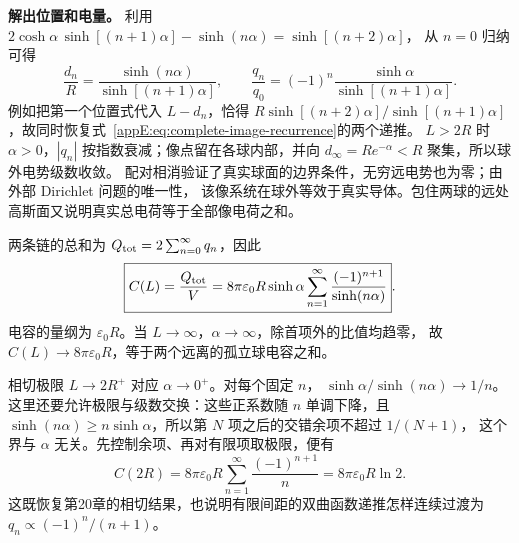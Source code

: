 \textbf{解出位置和电量。}
利用 $2\cosh\alpha\,\sinh[(n+1)\alpha]-\sinh(n\alpha)=\sinh[(n+2)\alpha]$，
从 $n=0$ 归纳可得
\[
 \frac{d_n}{R}=\frac{\sinh(n\alpha)}{\sinh[(n+1)\alpha]},\qquad
 \frac{q_n}{q_0}=(-1)^n\frac{\sinh\alpha}{\sinh[(n+1)\alpha]}.
\]
例如把第一个位置式代入 $L-d_n$，恰得
$R\sinh[(n+2)\alpha]/\sinh[(n+1)\alpha]$，故同时恢复式~\eqref{appE:eq:complete-image-recurrence}的两个递推。
$L>2R$ 时 $\alpha>0$，$|q_n|$ 按指数衰减；像点留在各球内部，并向
$d_\infty=Re^{-\alpha}<R$ 聚集，所以球外电势级数收敛。
配对相消验证了真实球面的边界条件，无穷远电势也为零；由外部 Dirichlet 问题的唯一性，
该像系统在球外等效于真实导体。包住两球的远处高斯面又说明真实总电荷等于全部像电荷之和。

两条链的总和为 $Q_{\rm tot}=2\sum_{n=0}^\infty q_n$，因此
\[
 \boxed{C(L)=\frac{Q_{\rm tot}}V
 =8\pi\varepsilon_0R\sinh\alpha
 \sum_{n=1}^\infty\frac{(-1)^{n+1}}{\sinh(n\alpha)}}.
\]
电容的量纲为 $\varepsilon_0R$。当 $L\to\infty$，$\alpha\to\infty$，除首项外的比值均趋零，
故 $C(L)\to8\pi\varepsilon_0R$，等于两个远离的孤立球电容之和。

相切极限 $L\to2R^+$ 对应 $\alpha\to0^+$。对每个固定 $n$，
$\sinh\alpha/\sinh(n\alpha)\to1/n$。
这里还要允许极限与级数交换：这些正系数随 $n$ 单调下降，且
$\sinh(n\alpha)\ge n\sinh\alpha$，所以第 $N$ 项之后的交错余项不超过 $1/(N+1)$，
这个界与 $\alpha$ 无关。先控制余项、再对有限项取极限，便有
\[
 C(2R)=8\pi\varepsilon_0R\sum_{n=1}^\infty\frac{(-1)^{n+1}}n
 =\boxed{8\pi\varepsilon_0R\ln2}.
\]
这既恢复第20章的相切结果，也说明有限间距的双曲函数递推怎样连续过渡为 $q_n\propto(-1)^n/(n+1)$。
